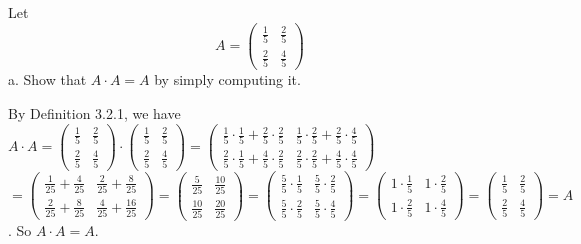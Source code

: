 \documentclass[12pt]{article}
\newenvironment{problem}[2][Problem]
{
	\begin{trivlist} 
		\item[\hskip \labelsep {\bfseries #1 #2:}]
	}
{
	\end{trivlist}
	}
\newenvironment{solution}[1][Solution]
{
	\begin{trivlist} 
		\item[\hskip \labelsep {\itshape #1:}]
	}
	{
	\end{trivlist}
}
\begin{document}
\newpage
\begin{problem}{2}
Let
\[
A=\begin{pmatrix} \frac{1}{5}&\frac{2}{5} \\ \frac{2}{5} &\frac{4}{5}\end{pmatrix}
\]
\noindent
\newline
\newline
a. Show that $A\cdot A=A$ by simply computing it.
\begin{solution}
By Definition 3.2.1, we have $A \cdot A = \begin{pmatrix} \frac{1}{5}&\frac{2}{5} \\ \frac{2}{5} &\frac{4}{5}\end{pmatrix} \cdot \begin{pmatrix} \frac{1}{5}&\frac{2}{5} \\ \frac{2}{5} &\frac{4}{5}\end{pmatrix} = \begin{pmatrix} \frac{1}{5} \cdot \frac{1}{5} + \frac{2}{5} \cdot \frac{2}{5} & \frac{1}{5} \cdot \frac{2}{5} + \frac{2}{5} \cdot \frac{4}{5} \\ \frac{2}{5} \cdot \frac{1}{5} + \frac{4}{5} \cdot \frac{2}{5} & \frac{2}{5} \cdot \frac{2}{5} + \frac{4}{5} \cdot \frac{4}{5} \end{pmatrix}$
\noindent
$=  \begin{pmatrix} \frac{1}{25}  + \frac{4}{25} & \frac{2}{25} + \frac{8}{25}\\ \frac{2}{25} + \frac{8}{25} & \frac{4}{25} + \frac{16}{25} \end{pmatrix}=\begin{pmatrix} \frac{5}{25}  & \frac{10}{25} \\ \frac{10}{25} & \frac{20}{25} \end{pmatrix} = \begin{pmatrix} \frac{5}{5} \cdot \frac{1}{5}  &\frac{5}{5} \cdot \frac{2}{5} \\ \frac{5}{5} \cdot \frac{2}{5} & \frac{5}{5} \cdot \frac{4}{5} \end{pmatrix} =\begin{pmatrix}1 \cdot \frac{1}{5}  &1 \cdot \frac{2}{5} \\ 1 \cdot \frac{2}{5} &1 \cdot \frac{4}{5} \end{pmatrix} = \begin{pmatrix} \frac{1}{5}&\frac{2}{5} \\ \frac{2}{5} &\frac{4}{5}\end{pmatrix} = A$. So $A \cdot A = A$.


\end{solution}
\end{problem}
\end{document}
